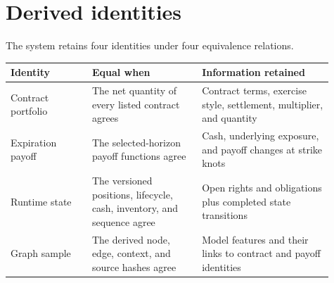 \documentclass{strategynet-journal}
\begin{document}
\section{Derived identities}
\label{sec:identity}

The system retains four identities under four equivalence relations.

\begin{center}
\begin{tabular}{@{}P{0.23\linewidth}P{0.31\linewidth}P{0.37\linewidth}@{}}
\toprule
Identity & Equal when & Information retained \\
\midrule
Contract portfolio &
The net quantity of every listed contract agrees &
Contract terms, exercise style, settlement, multiplier, and quantity \\
Expiration payoff &
The selected-horizon payoff functions agree &
Cash, underlying exposure, and payoff changes at strike knots \\
Runtime state &
The versioned positions, lifecycle, cash, inventory, and sequence agree &
Open rights and obligations plus completed state transitions \\
Graph sample &
The derived node, edge, context, and source hashes agree &
Model features and their links to contract and payoff identities \\
\bottomrule
\end{tabular}
\end{center}
\end{document}
